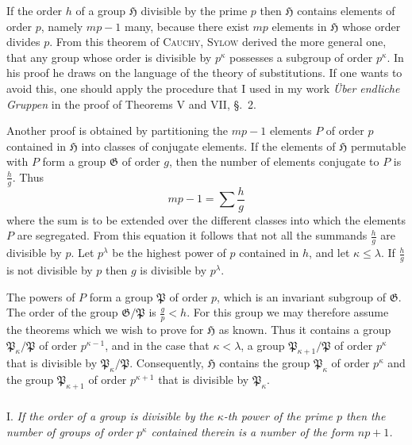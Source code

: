 \documentclass[a5paper,12pt]{article}
\newcommand{\secformat}[1]{\centering{\normalfont\normalsize{#1}}}
\let\fr\mathfrak
\newcommand{\CG}{\fr{G}}
\newcommand{\CH}{\fr{H}}
\newcommand{\CP}{\fr{P}}
\newcommand{\?}{{\color{blue}${}^{(?)}$}}
\newcounter{origpagecounter}{}
\newcommand{\origpagebreak}{\mark{\arabic{origpagecounter}}\addtocounter{origpagecounter}{1}\mark{\arabic{origpagecounter}}}
\begin{document}
If the order $h$ of a group $\CH$ divisible by the prime $p$
then
$\CH$ contains elements of order $p$,
namely $m p - 1$ many,
because there exist $m p$ elements in $\CH$
whose order divides $p$.
%
%
From this theorem of \textsc{Cauchy},
\textsc{Sylow}
derived the more general one,
that
any group whose order is divisible by $p^\kappa$
possesses
a subgroup of order $p^\kappa$.
%
%
In his proof he draws on
the language of the theory of substitutions.
%
%
If one wants to avoid this,
one should apply the procedure
that I used
in my work
\emph{\"Uber endliche Gruppen}
in the proof of 
Theorems V and VII, \S.~2.


Another proof is obtained
by partitioning
the $m p - 1$ elements $P$ of order $p$ contained in $\CH$ 
into classes of conjugate elements.
%
%
If the elements of $\CH$ permutable with $P$
form a group $\CG$ of order $g$,
then
the number of elements conjugate to $P$ is $\frac{h}{g}$.
%
%
Thus
\[
	m p - 1
	=
	\sum \frac{h}{g}
\]
where the sum is to be extended
over the different classes
into which the elements $P$ are segregated.
%
%
From this equation it follows
that
not all the summands $\frac{h}{g}$
are divisible by $p$.
%
%
Let $p^\lambda$ be the highest power of $p$ contained in $h$,
and
let $\kappa \leq \lambda$.
%
%
If $\frac{h}{g}$ is not divisible by $p$
then $g$ is divisible by $p^\lambda$.
%
%
\origpagebreak
%
%
The powers of $P$ form a group $\CP$ of order $p$,
which is an invariant subgroup of $\CG$.
%
%
The order of the group $\CG / \CP$ is $\frac{g}{p} < h$.
%
%
For this group we may therefore
assume the theorems
which we wish to prove for $\CH$ as known.
%
%
Thus it contains 
a group $\CP_\kappa / \CP$
of order $p^{\kappa - 1}$,
and in the case that $\kappa < \lambda$,
a group $\CP_{\kappa+1} / \CP$ of order $p^\kappa$
that is divisible by $\CP_\kappa / \CP$.
%
%
Consequently,
$\CH$ contains the group $\CP_\kappa$ of order $p^\kappa$
and the group $\CP_{\kappa+1}$ of order $p^{\kappa+1}$
that is divisible by $\CP_\kappa$.


\subsubsection*{\secformat{\S.~4.}}

I.
%
\label{t:4-1}
%
\emph{ %
If the order of a group is divisible by 
the $\kappa$-th power of the prime $p$
then
the number of groups of order $p^\kappa$
contained therein
is a number of the form $n p + 1$.
}
\end{document}
